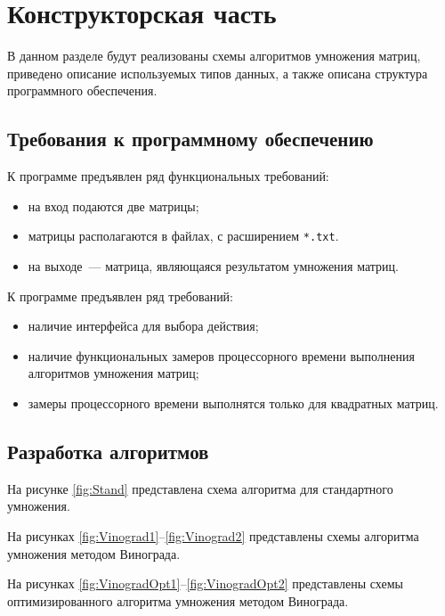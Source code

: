\chapter{Конструкторская часть}
В данном разделе будут реализованы схемы алгоритмов умножения матриц, приведено описание используемых типов данных, а также описана структура программного обеспечения.

\section{Требования к программному обеспечению}\label{section:requirements_1}
К программе предъявлен ряд функциональных требований:
\begin{itemize}
    \item на вход подаются две матрицы;
    \item матрицы располагаются в файлах, с расширением \texttt{*.txt}.
    \item на выходе~--- матрица, являющаяся результатом умножения матриц.
\end{itemize}

К программе предъявлен ряд требований:
\begin{itemize}
	\item наличие интерфейса для выбора действия;
	\item наличие функциональных замеров процессорного времени выполнения алгоритмов умножения матриц;
	\item замеры процессорного времени выполнятся только для квадратных матриц.
\end{itemize}

\section{Разработка алгоритмов}
На рисунке \ref{fig:Stand} представлена схема алгоритма для стандартного умножения.

На рисунках \ref{fig:Vinograd1}--\ref{fig:Vinograd2} представлены схемы алгоритма умножения методом Винограда.

На рисунках \ref{fig:VinogradOpt1}--\ref{fig:VinogradOpt2} представлены схемы оптимизированного алгоритма умножения методом Винограда.

